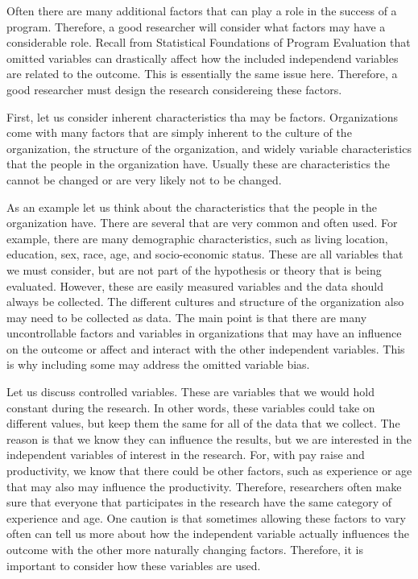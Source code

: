 \documentclass[]{book}
\theoremstyle{definition}
\theoremstyle{definition}
\theoremstyle{definition}
\theoremstyle{remark}
\begin{document}
Often there are many additional factors that can play a role in the
success of a program. Therefore, a good researcher will consider what
factors may have a considerable role. Recall from Statistical
Foundations of Program Evaluation that omitted variables can drastically
affect how the included independend variables are related to the
outcome. This is essentially the same issue here. Therefore, a good
researcher must design the research considereing these factors.

First, let us consider inherent characteristics tha may be factors.
Organizations come with many factors that are simply inherent to the
culture of the organization, the structure of the organization, and
widely variable characteristics that the people in the organization
have. Usually these are characteristics the cannot be changed or are
very likely not to be changed.

As an example let us think about the characteristics that the people in
the organization have. There are several that are very common and often
used. For example, there are many demographic characteristics, such as
living location, education, sex, race, age, and socio-economic status.
These are all variables that we must consider, but are not part of the
hypothesis or theory that is being evaluated. However, these are easily
measured variables and the data should always be collected. The
different cultures and structure of the organization also may need to be
collected as data. The main point is that there are many uncontrollable
factors and variables in organizations that may have an influence on the
outcome or affect and interact with the other independent variables.
This is why including some may address the omitted variable bias.

Let us discuss controlled variables. These are variables that we would
hold constant during the research. In other words, these variables could
take on different values, but keep them the same for all of the data
that we collect. The reason is that we know they can influence the
results, but we are interested in the independent variables of interest
in the research. For, with pay raise and productivity, we know that
there could be other factors, such as experience or age that may also
may influence the productivity. Therefore, researchers often make sure
that everyone that participates in the research have the same category
of experience and age. One caution is that sometimes allowing these
factors to vary often can tell us more about how the independent
variable actually influences the outcome with the other more naturally
changing factors. Therefore, it is important to consider how these
variables are used.
\end{document}

